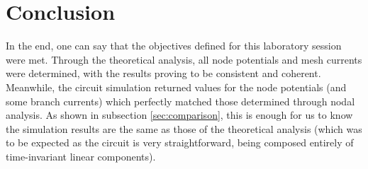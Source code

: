\section{Conclusion}
\label{sec:conclusion}

\par
In the end, one can say that the objectives defined for this laboratory session were met.
Through the theoretical analysis, all node potentials and mesh currents were determined, with the results proving to be consistent and coherent.
Meanwhile, the circuit simulation returned values for the node potentials (and some branch currents) which perfectly matched those determined through nodal analysis. As shown in subsection \ref{sec:comparison}, this is enough for us to know the simulation results are the same as those of the theoretical analysis (which was to be expected as the circuit is very straightforward, being composed entirely of time-invariant linear components).

